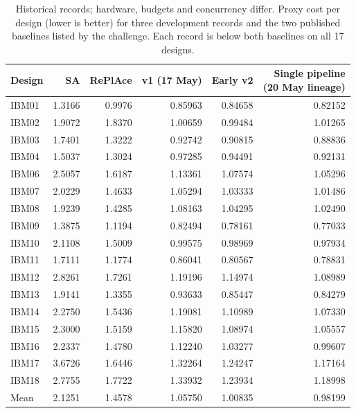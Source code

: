 \begin{table}[htbp]
\centering
\footnotesize
\caption{Historical records; hardware, budgets and concurrency differ. Proxy cost per design (lower is better) for three development records and the two published baselines listed by the challenge. Each record is below both baselines on all 17 designs.}
\label{tab:historical-baselines}
\begin{tabular}{lrrrrr}
\toprule
Design & SA & RePlAce & v1 (17 May) & Early v2 & \shortstack{Single pipeline\\(20 May lineage)} \\
\midrule
IBM01 & 1.3166 & 0.9976 & 0.85963 & 0.84658 & 0.82152 \\
IBM02 & 1.9072 & 1.8370 & 1.00659 & 0.99484 & 1.01265 \\
IBM03 & 1.7401 & 1.3222 & 0.92742 & 0.90815 & 0.88836 \\
IBM04 & 1.5037 & 1.3024 & 0.97285 & 0.94491 & 0.92131 \\
IBM06 & 2.5057 & 1.6187 & 1.13361 & 1.07574 & 1.05296 \\
IBM07 & 2.0229 & 1.4633 & 1.05294 & 1.03333 & 1.01486 \\
IBM08 & 1.9239 & 1.4285 & 1.08163 & 1.04295 & 1.02490 \\
IBM09 & 1.3875 & 1.1194 & 0.82494 & 0.78161 & 0.77033 \\
IBM10 & 2.1108 & 1.5009 & 0.99575 & 0.98969 & 0.97934 \\
IBM11 & 1.7111 & 1.1774 & 0.86041 & 0.80567 & 0.78831 \\
IBM12 & 2.8261 & 1.7261 & 1.19196 & 1.14974 & 1.08989 \\
IBM13 & 1.9141 & 1.3355 & 0.93633 & 0.85447 & 0.84279 \\
IBM14 & 2.2750 & 1.5436 & 1.19081 & 1.10989 & 1.07330 \\
IBM15 & 2.3000 & 1.5159 & 1.15820 & 1.08974 & 1.05557 \\
IBM16 & 2.2337 & 1.4780 & 1.12240 & 1.03277 & 0.99607 \\
IBM17 & 3.6726 & 1.6446 & 1.32264 & 1.24247 & 1.17164 \\
IBM18 & 2.7755 & 1.7722 & 1.33932 & 1.23934 & 1.18998 \\
\midrule
Mean & 2.1251 & 1.4578 & 1.05750 & 1.00835 & 0.98199 \\
\bottomrule
\end{tabular}
\end{table}
